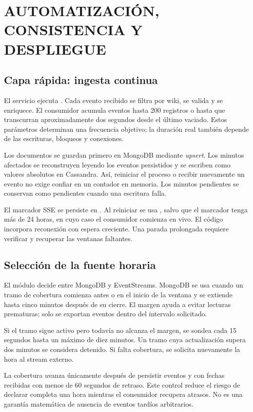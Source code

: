 \chapter{AUTOMATIZACIÓN, CONSISTENCIA Y DESPLIEGUE}
\label{cap:pipeline}
\section{Capa rápida: ingesta continua}
El servicio  ejecuta . Cada evento recibido se filtra por wiki, se valida y se enriquece. El consumidor acumula eventos hasta 200 registros o hasta que transcurran aproximadamente dos segundos desde el último vaciado. Estos parámetros determinan una frecuencia objetivo; la duración real también depende de las escrituras, bloqueos y conexiones.

Los documentos se guardan primero en MongoDB mediante \textit{upsert}. Los minutos afectados se reconstruyen leyendo los eventos persistidos y se escriben como valores absolutos en Cassandra. Así, reiniciar el proceso o recibir nuevamente un evento no exige confiar en un contador en memoria. Los minutos pendientes se conservan como pendientes cuando una escritura falla.

El marcador SSE se persiste en . Al reiniciar se usa , salvo que el marcador tenga más de 24 horas, en cuyo caso el consumidor comienza en vivo. El código incorpora reconexión con espera creciente. Una parada prolongada requiere verificar y recuperar las ventanas faltantes.

\section{Selección de la fuente horaria}
El módulo  decide entre MongoDB y EventStreams. MongoDB se usa cuando un tramo de cobertura comienza antes o en el inicio de la ventana y se extiende hasta cinco minutos después de su cierre. El margen ayuda a evitar lecturas prematuras; solo se exportan eventos dentro del intervalo solicitado.

Si el tramo sigue activo pero todavía no alcanza el margen, se sondea cada 15 segundos hasta un máximo de diez minutos. Un tramo cuya actualización supera dos minutos se considera detenido. Si falta cobertura, se solicita nuevamente la hora al stream externo.

La cobertura avanza únicamente después de persistir eventos y con fechas recibidas con menos de 60 segundos de retraso. Este control reduce el riesgo de declarar completa una hora mientras el consumidor recupera atrasos. No es una garantía matemática de ausencia de eventos tardíos arbitrarios.

